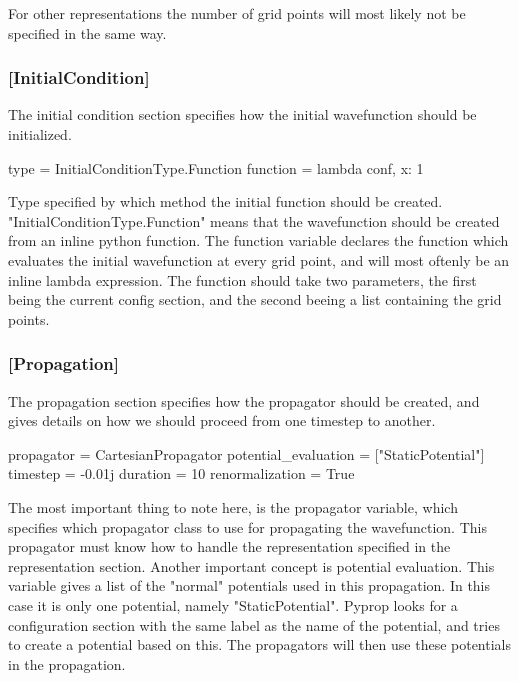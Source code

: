 For other representations the number of grid points will most likely not be specified in the same way.

\subsubsection*{[InitialCondition]}
The initial condition section specifies how the initial wavefunction should be initialized.
\begin{python}
	[InitialCondition]
	type = InitialConditionType.Function
	function = lambda conf, x: 1
\end{python}
Type specified by which method the initial function should be created. "InitialConditionType.Function" means that the
wavefunction should be created from an inline python function. The function variable declares the function which evaluates
the initial wavefunction at every grid point, and will most oftenly be an inline lambda expression. The function should take
two parameters, the first being the current config section, and the second beeing a list containing the grid points.

\subsubsection*{[Propagation]}
The propagation section specifies how the propagator should be created, and gives details on how we should
proceed from one timestep to another.
\begin{python}
	[Propagation]
	propagator = CartesianPropagator
	potential_evaluation = ["StaticPotential"]
	timestep = -0.01j
	duration = 10
	renormalization = True
\end{python}
The most important thing to note here, is the propagator variable, which specifies which propagator class to use
for propagating the wavefunction. This propagator must know how to handle the representation specified in the
representation section. Another important concept is potential evaluation. This variable gives a list of the
"normal" potentials used in this propagation. In this case it is only one potential, namely "StaticPotential". 
Pyprop looks for a configuration section with the same label as the name of the potential, and tries to create
a potential based on this. The propagators will then use these potentials in the propagation.

